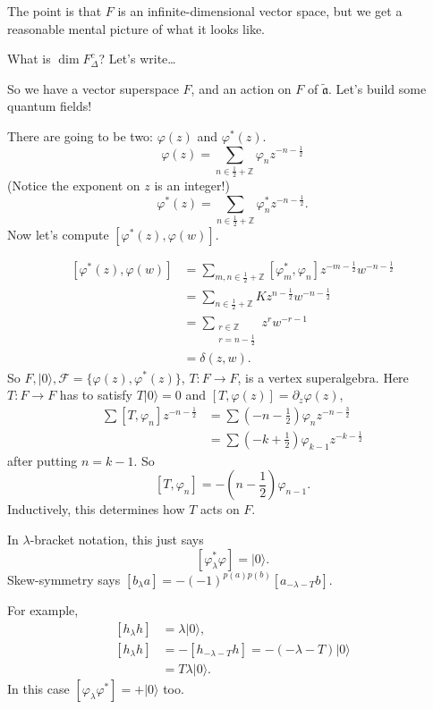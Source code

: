 The point is that $F$ is an
infinite-dimensional
vector space, but we get a reasonable mental
picture of what it looks like.

What is $\dim F_\Delta^c$? Let's write…

\medskip\noindent
So we have a vector superspace $F$,
and an action on $F$ of
$\tilde{\mathfrak{a}}$.
Let's build some quantum fields!

There are going to be two: $\varphi(z)$
and $\varphi^*(z)$.
$$
\varphi(z)=\sum_{n \in
\frac{1}{2}+\mathbb{Z}}\varphi_nz^{-n-
\frac{1}{2}}
$$
(Notice the exponent on $z$ is an integer!)
$$
\varphi^* (z)=\sum_{n \in
\frac{1}{2}+\mathbb{Z}}
\varphi^*_n z^{-n-\frac{1}{2}}.
$$
Now let's compute
$[\varphi^*(z),\varphi(w)]$.

$$
\begin{aligned}
[\varphi^*(z),\varphi(w)]&=\sum_{m,n \in
\frac{1}{2}+\mathbb{Z}}
[\varphi^*_m,\varphi_n]z^{-m-\frac{1}{2}}w^{-
n-\frac{1}{2}}\\
&=\sum_{n \in
\frac{1}{2}+\mathbb{Z}}Kz^{n-\frac{1}{2}}w^{-
n-\frac{1}{2}}\\
&=\sum_{\substack{r \in \mathbb{Z} \\
r=n-\frac{1}{2}}}z^rw^{-r-1}\\
&=\delta(z,w).
\end{aligned}
$$
So
$F,|0\rangle,\mathcal{F}=\{\varphi(z),
\varphi^*(z)\}$,
$T:F\to F$, is a vertex superalgebra.
Here $T:F \to F$ has to satisfy
$T|0\rangle=0$ and
$[T,\varphi(z)]=\partial_z\varphi(z)$,
$$
\begin{aligned}
\sum [T,\varphi_n]z^{-n-\frac{1}{2}}&=
\sum (-n-\frac{1}{2})\varphi_n
z^{-n-\frac{3}{2}}\\
&=\sum
(-k+\frac{1}{2})\varphi_{k-1}z^{-k-\frac{1}
{2}}
\end{aligned}
$$
after putting $n=k-1$. So
$$
[T,\varphi_n]=-(n-\frac{1}{2})\varphi_{n-1}.
$$
Inductively, this determines
how $T$ acts on $F$.

\medskip\noindent
In $\lambda$-bracket notation, this just says
$$
[\varphi^* _\lambda\varphi]=|0\rangle.
$$
Skew-symmetry says $[b_\lambda
a]=-(-1)^{p(a)p(b)}[a_{-\lambda -T}b]$.

For example,
$$
\begin{aligned}
[h_\lambda h]&=\lambda |0\rangle,\\
[h_\lambda
h]&=-[h_{-\lambda-T}h]=-(-\lambda-T)
|0\rangle\\
&=T\lambda |0\rangle.
\end{aligned}
$$
In this case $[\varphi_\lambda \varphi^*
]=+|0\rangle$ too.

